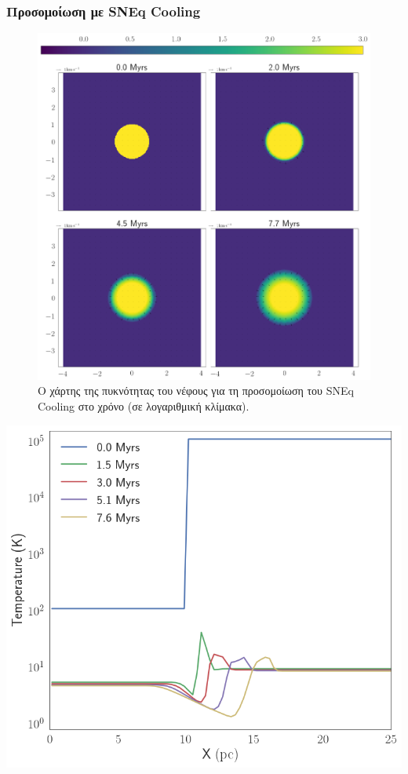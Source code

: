 	
	\subsubsection{Προσομοίωση με SNEq Cooling}
	
			\begin{figure}
				\includegraphics[width=1\linewidth]{DataImages/SNCoolingRHOquad}
				\caption{Ο χάρτης της πυκνότητας του νέφους για τη προσομοίωση του SNEq Cooling στο χρόνο (σε λογαριθμική κλίμακα).}
				\label{fig:sncoolingrhoquad}
			\end{figure}
		
\begin{marginfigure}
	\centering
	\includegraphics[width=1\linewidth]{DataImages/SNCoolingTMPprofile}
	\caption{}
	\label{fig:sncoolingtmpprofile}
\end{marginfigure}

